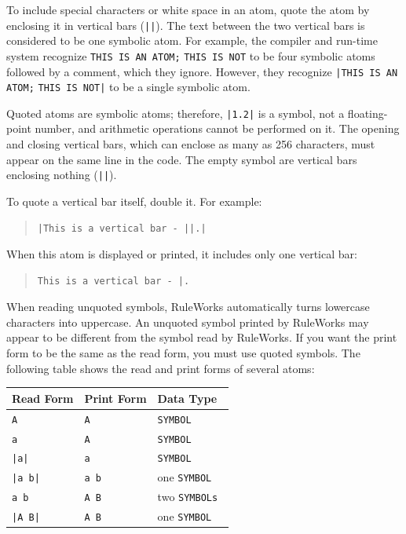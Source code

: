 To include special characters or white space in an atom, quote the
atom by enclosing it in vertical bars (\verb,||,). The text between
the two vertical bars is considered to be one symbolic atom. For
example, the compiler and run-time system recognize
\verb|THIS IS AN ATOM;| \verb|THIS IS NOT| to be four symbolic atoms followed
by a comment, which they ignore. However, they recognize
\verb,|THIS IS AN ATOM;, \verb,THIS IS NOT|, to be a single symbolic
atom.

Quoted atoms are symbolic atoms; therefore, \verb,|1.2|, is a symbol,
not a floating-point number, and arithmetic operations cannot be
performed on it. The opening and closing vertical bars, which can
enclose as many as 256 characters, must appear on the same line in the
code. The empty symbol are vertical bars enclosing nothing
(\verb,||,).

To quote a vertical bar itself, double it. For example:

\begin{quote}
\begin{verbatim}
|This is a vertical bar - ||.|
\end{verbatim}
\end{quote}

When this atom is displayed or printed, it includes only one
vertical bar:

\begin{quote}
\begin{verbatim}
This is a vertical bar - |.
\end{verbatim}
\end{quote}

When reading unquoted symbols, RuleWorks automatically turns lowercase
characters into uppercase. An unquoted symbol printed by RuleWorks may
appear to be different from the symbol read by RuleWorks. If you want
the print form to be the same as the read form, you must use quoted
symbols. The following table shows the read and print forms of several
atoms:

\begin{center}
  \begin{tabular}{lll}
    \toprule
    Read Form & Print Form & Data Type \\
    \midrule
    \verb,A, &  \verb,A, & \tt{SYMBOL} \\
    \verb,a,        & \verb,A,          & \tt{SYMBOL} \\
    \verb,|a|,       & \verb,a,          & \tt{SYMBOL} \\
    \verb,|a b|,     & \verb,a b,        & one \tt{SYMBOL} \\
    \verb,a b,       & \verb,A B,        & two \tt{SYMBOL}s \\
    \verb,|A B|,     & \verb,A B,        & one \tt{SYMBOL} \\
  \bottomrule
  \end{tabular}
\end{center}

